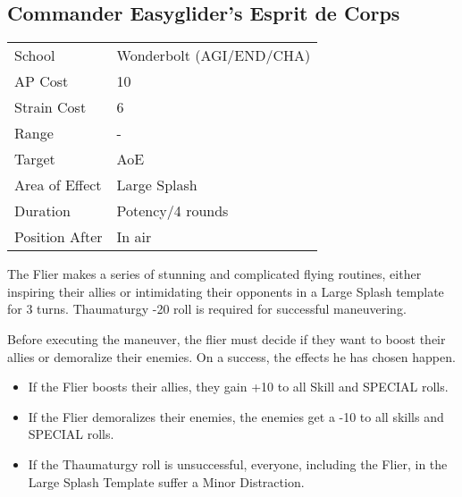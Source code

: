 \documentclass[11pt,a4paper,twocolumn]{book}
\begin{document}


\subsection*{Commander Easyglider's Esprit de Corps}
{
	\begin{tabu} to 75mm{| X[l,4] | X[l,7] |}
		\hline
		School 			& Wonderbolt (AGI/END/CHA) 		\\
		AP Cost	      	& 10 				\\
		Strain Cost     & 6 				\\
		Range     		& - 				\\
		Target      	& AoE 				\\
		Area of Effect  & Large Splash 	 	\\
		Duration     	& Potency/4 rounds	 		\\
		Position After  & In air 			\\ \hline
	\end{tabu}
}

\medskip

The Flier makes a series of stunning and complicated flying routines, either inspiring their allies or intimidating their opponents in a Large Splash template for 3 turns. Thaumaturgy -20 roll is required for successful maneuvering.

Before executing the maneuver, the flier must decide if they want to boost their allies or demoralize their enemies. On a success, the effects he has chosen happen.

\begin{itemize}
	\item	If the Flier boosts their allies, they gain +10 to all Skill and SPECIAL rolls.
	\item If the Flier demoralizes their enemies, the enemies get a -10 to all skills and SPECIAL rolls.
	\item If the Thaumaturgy roll is unsuccessful, everyone, including the Flier, in the Large Splash Template suffer a Minor Distraction.
\end{itemize}

\end{document}
